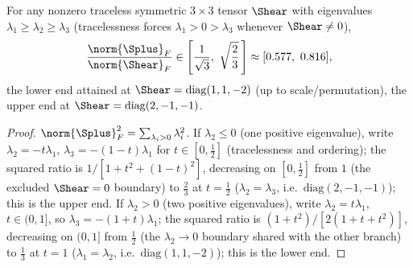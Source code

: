 \begin{corollary}
\label{cor:shear-regularisation-bound}
For any nonzero traceless symmetric $3\times3$ tensor $\Shear$ with
eigenvalues $\lambda_1\geq\lambda_2\geq\lambda_3$ (tracelessness forces
$\lambda_1>0>\lambda_3$ whenever $\Shear\neq0$),
\begin{equation}
  \frac{\norm{\Splus}_F}{\norm{\Shear}_F} \in
  \left[\frac{1}{\sqrt3},\ \sqrt{\frac23}\,\right] \approx [0.577,\ 0.816] ,
\end{equation}
the lower end attained at $\Shear=\mathrm{diag}(1,1,-2)$ (up to scale/permutation),
the upper end at $\Shear=\mathrm{diag}(2,-1,-1)$.
\end{corollary}
\begin{proof}
$\norm{\Splus}_F^2=\sum_{\lambda_i>0}\lambda_i^2$. If $\lambda_2\leq0$
(one positive eigenvalue), write $\lambda_2=-t\lambda_1$,
$\lambda_3=-(1-t)\lambda_1$ for $t\in[0,\tfrac12]$ (tracelessness and
ordering); the squared ratio is
$1/[1+t^2+(1-t)^2]$, decreasing on $[0,\tfrac12]$ from $1$ (the excluded
$\Shear=0$ boundary) to $\tfrac23$ at $t=\tfrac12$
($\lambda_2=\lambda_3$, i.e.\ $\mathrm{diag}(2,-1,-1)$); this is the upper end.
If $\lambda_2>0$ (two positive eigenvalues), write $\lambda_2=t\lambda_1$,
$t\in(0,1]$, so $\lambda_3=-(1+t)\lambda_1$; the squared ratio is
$(1+t^2)/[2(1+t+t^2)]$, decreasing on $(0,1]$ from $\tfrac12$ (the
$\lambda_2\to0$ boundary shared with the other branch) to $\tfrac13$ at
$t=1$ ($\lambda_1=\lambda_2$, i.e.\ $\mathrm{diag}(1,1,-2)$); this is the lower
end.
\end{proof}

